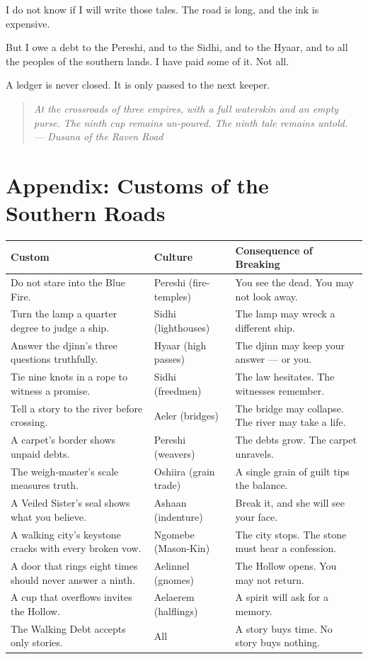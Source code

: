 \documentclass[10pt,twoside]{book}
\newcommand{\dusana}[1]{\begin{quote}\itshape #1 \\ --- Dusana of the Raven Road\end{quote}}
\begin{document}
I do not know if I will write those tales. The road is long, and the ink is expensive.

But I owe a debt to the Pereshi, and to the Sidhi, and to the Hyaar, and to all the peoples of the southern lands. I have paid some of it. Not all.

A ledger is never closed. It is only passed to the next keeper.

\dusana{At the crossroads of three empires, with a full waterskin and an empty purse. The ninth cup remains un-poured. The ninth tale remains untold.}

\chapter*{Appendix: Customs of the Southern Roads}

\begin{table}[h]
\centering
\begin{tabularx}{\textwidth}{p{4cm} p{4cm} X}
\toprule
\textbf{Custom} & \textbf{Culture} & \textbf{Consequence of Breaking} \\
\midrule
Do not stare into the Blue Fire. & Pereshi (fire-temples) & You see the dead. You may not look away. \\
Turn the lamp a quarter degree to judge a ship. & Sidhi (lighthouses) & The lamp may wreck a different ship. \\
Answer the djinn's three questions truthfully. & Hyaar (high passes) & The djinn may keep your answer --- or you. \\
Tie nine knots in a rope to witness a promise. & Sidhi (freedmen) & The law hesitates. The witnesses remember. \\
Tell a story to the river before crossing. & Aeler (bridges) & The bridge may collapse. The river may take a life. \\
A carpet's border shows unpaid debts. & Pereshi (weavers) & The debts grow. The carpet unravels. \\
The weigh‑master's scale measures truth. & Oshiira (grain trade) & A single grain of guilt tips the balance. \\
A Veiled Sister's seal shows what you believe. & Ashaan (indenture) & Break it, and she will see your face. \\
A walking city's keystone cracks with every broken vow. & Ngomebe (Mason‑Kin) & The city stops. The stone must hear a confession. \\
A door that rings eight times should never answer a ninth. & Aelinnel (gnomes) & The Hollow opens. You may not return. \\
A cup that overflows invites the Hollow. & Aelaerem (halflings) & A spirit will ask for a memory. \\
The Walking Debt accepts only stories. & All & A story buys time. No story buys nothing. \\
\bottomrule
\end{tabularx}
\end{table}
\end{document}
